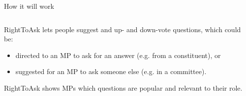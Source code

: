 \documentclass[10pt,xcolor=svgnames,169]{beamer} %
\begin{document}
	\begin{frame}[fragile]{How it will work}
	
	
	\begin{columns}
		\begin{column}{0.5\textwidth}
			
	RightToAsk lets people
	 suggest and up- and down-vote questions, which could be:
	
	\begin{itemize}
		\item directed to an MP
		to ask for an answer (e.g. from a constituent), or
		\item suggested for an MP to ask someone else (e.g. in a committee).		
	\end{itemize}

	
	RightToAsk shows MPs which questions are popular and relevant to their role.
	

\end{column}
\end{columns}
\end{frame}
\end{document}

